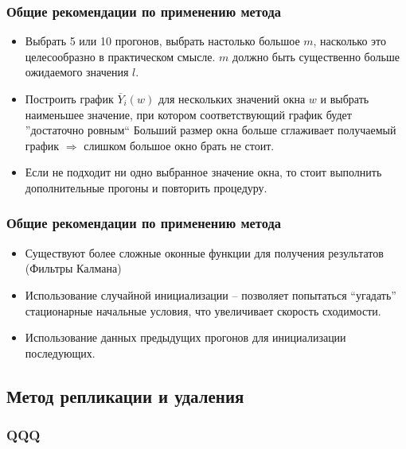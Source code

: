\documentclass[utf8]{beamer}
\begin{document}
\begin{frame}
\frametitle{Общие рекомендации по применению метода}
\begin{itemize}
  \item Выбрать 5 или 10 прогонов, выбрать настолько большое $m$,
  насколько это целесообразно в практическом смысле. $m$  должно быть
  существенно больше ожидаемого значения $l$.
  \item Построить график $\overline{Y}_i(w)$ для нескольких значений
  окна $w$ и выбрать наименьшее значение, при котором соответствующий
  график будет ''достаточно ровным`` Больший размер окна больше
  сглаживает получаемый график $\Rightarrow$ слишком большое окно
  брать не стоит.
  \item Если не подходит ни одно выбранное значение окна, то стоит
  выполнить дополнительные прогоны и повторить процедуру.
\end{itemize}
\end{frame}
\begin{frame}
\frametitle{Общие рекомендации по применению метода}
\begin{itemize}
  \item Существуют более сложные оконные функции для получения результатов (Фильтры Калмана)
  \item Использование случайной инициализации -- позволяет попытаться
  ``угадать'' стационарные начальные условия, что увеличивает скорость
  сходимости.
  \item Использование данных предыдущих прогонов для инициализации
  последующих.
\end{itemize}
\end{frame}
\subsection{Метод репликации и удаления}
\begin{frame}
\frametitle{QQQ}

\end{frame}
\end{document}
